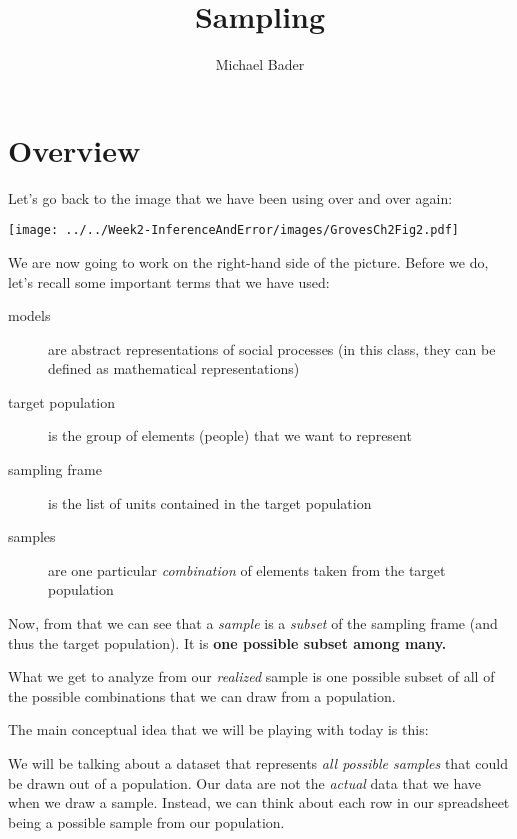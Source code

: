 \documentclass[11pt]{lecturenotes}
\title{Sampling}
\author{Michael Bader}
\begin{document}
\maketitle

\begin{objectives}{
\item 
}{
\item 
}
\end{objectives}

\section{Overview}
Let's go back to the image that we have been using over and over again: 

\begin{center}
\texttt{[image: ../../Week2-InferenceAndError/images/GrovesCh2Fig2.pdf]}
\end{center}

We are now going to work on the right-hand side of the picture. Before we do, let's recall some important terms that we have used: 

\begin{description}
\item[models] are abstract representations of social processes (in this class, they can be defined as mathematical representations)
\item[target population] is the group of elements (people) that we want to represent
\item[sampling frame] is the list of units contained in the target population
\item[samples] are one particular \emph{combination} of elements taken from the target population
\end{description}

Now, from that we can see that a \emph{sample} is a \emph{subset} of the sampling frame (and thus the target population). It is \textbf{one possible subset among many.}

What we get to analyze from our \emph{realized} sample is one possible subset of all of the possible combinations that we can draw from a population. 


The main conceptual idea that we will be playing with today is this: 

We will be talking about a dataset that represents \emph{all possible samples} that could be drawn out of a population. Our data are not the \emph{actual} data that we have when we draw a sample. Instead, we can think about each row in our spreadsheet being a possible sample from our population. 
\end{document}
